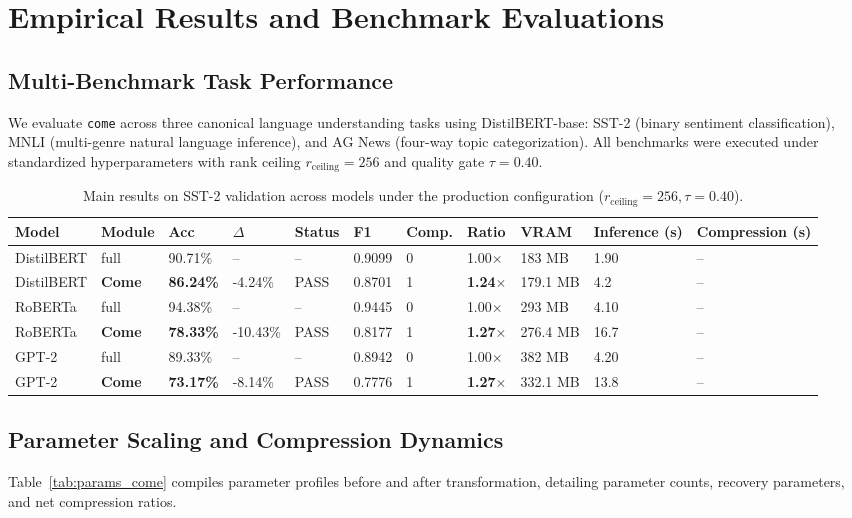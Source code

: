 \section{Empirical Results and Benchmark Evaluations}
\label{sec:results}

\subsection{Multi-Benchmark Task Performance}
We evaluate \texttt{come} across three canonical language understanding tasks using DistilBERT-base: SST-2 (binary sentiment classification), MNLI (multi-genre natural language inference), and AG News (four-way topic categorization). All benchmarks were executed under standardized hyperparameters with rank ceiling $r_{\mathrm{ceiling}} = 256$ and quality gate $\tau = 0.40$.

\begin{table}[t]
\centering
\small
\begin{tabular}{lllllllllll}
\toprule
\textbf{Model} & \textbf{Module} & \textbf{Acc} & \textbf{$\Delta$} & \textbf{Status} & \textbf{F1} & \textbf{Comp.} & \textbf{Ratio} & \textbf{VRAM} & \textbf{Inference (s)} & \textbf{Compression (s)} \\
\midrule
DistilBERT & full & 90.71\% & -- & -- & 0.9099 & 0 & 1.00$\times$ & 183 MB & 1.90 & -- \\
DistilBERT & \textbf{Come} & \textbf{86.24\%} & -4.24\% & PASS & 0.8701 & 1 & \textbf{1.24$\times$} & 179.1 MB & 4.2 & -- \\
RoBERTa & full & 94.38\% & -- & -- & 0.9445 & 0 & 1.00$\times$ & 293 MB & 4.10 & -- \\
RoBERTa & \textbf{Come} & \textbf{78.33\%} & -10.43\% & PASS & 0.8177 & 1 & \textbf{1.27$\times$} & 276.4 MB & 16.7 & -- \\
GPT-2 & full & 89.33\% & -- & -- & 0.8942 & 0 & 1.00$\times$ & 382 MB & 4.20 & -- \\
GPT-2 & \textbf{Come} & \textbf{73.17\%} & -8.14\% & PASS & 0.7776 & 1 & \textbf{1.27$\times$} & 332.1 MB & 13.8 & -- \\
\bottomrule
\end{tabular}
\caption{Main results on SST-2 validation across models under the production configuration ($r_{\mathrm{ceiling}}=256, \tau=0.40$).}
\label{tab:main_sst2}
\end{table}

\subsection{Parameter Scaling and Compression Dynamics}
Table~\ref{tab:params_come} compiles parameter profiles before and after transformation, detailing parameter counts, recovery parameters, and net compression ratios.

